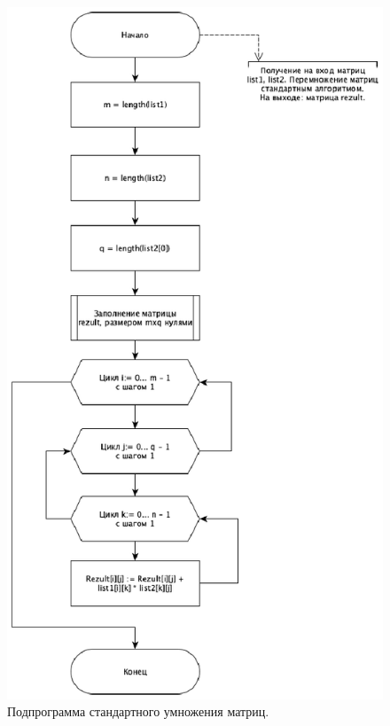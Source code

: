 \documentclass[12pt]{report}
\begin{document}
	\begin{figure}[H]
		\centering
		\includegraphics[width=0.8\linewidth]{Standard_sub}
		\caption{Подпрограмма стандартного умножения матриц.}
		\label{ris:image3}
	\end{figure}

\newpage
\end{document}

